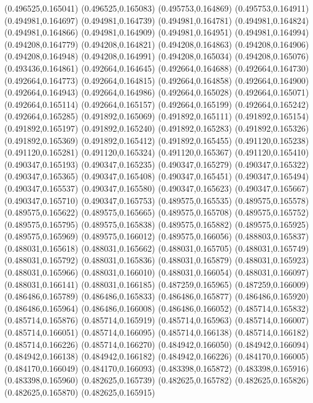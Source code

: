 (0.496525,0.165041)
(0.496525,0.165083)
(0.495753,0.164869)
(0.495753,0.164911)
(0.494981,0.164697)
(0.494981,0.164739)
(0.494981,0.164781)
(0.494981,0.164824)
(0.494981,0.164866)
(0.494981,0.164909)
(0.494981,0.164951)
(0.494981,0.164994)
(0.494208,0.164779)
(0.494208,0.164821)
(0.494208,0.164863)
(0.494208,0.164906)
(0.494208,0.164948)
(0.494208,0.164991)
(0.494208,0.165034)
(0.494208,0.165076)
(0.493436,0.164861)
(0.492664,0.164645)
(0.492664,0.164688)
(0.492664,0.164730)
(0.492664,0.164773)
(0.492664,0.164815)
(0.492664,0.164858)
(0.492664,0.164900)
(0.492664,0.164943)
(0.492664,0.164986)
(0.492664,0.165028)
(0.492664,0.165071)
(0.492664,0.165114)
(0.492664,0.165157)
(0.492664,0.165199)
(0.492664,0.165242)
(0.492664,0.165285)
(0.491892,0.165069)
(0.491892,0.165111)
(0.491892,0.165154)
(0.491892,0.165197)
(0.491892,0.165240)
(0.491892,0.165283)
(0.491892,0.165326)
(0.491892,0.165369)
(0.491892,0.165412)
(0.491892,0.165455)
(0.491120,0.165238)
(0.491120,0.165281)
(0.491120,0.165324)
(0.491120,0.165367)
(0.491120,0.165410)
(0.490347,0.165193)
(0.490347,0.165235)
(0.490347,0.165279)
(0.490347,0.165322)
(0.490347,0.165365)
(0.490347,0.165408)
(0.490347,0.165451)
(0.490347,0.165494)
(0.490347,0.165537)
(0.490347,0.165580)
(0.490347,0.165623)
(0.490347,0.165667)
(0.490347,0.165710)
(0.490347,0.165753)
(0.489575,0.165535)
(0.489575,0.165578)
(0.489575,0.165622)
(0.489575,0.165665)
(0.489575,0.165708)
(0.489575,0.165752)
(0.489575,0.165795)
(0.489575,0.165838)
(0.489575,0.165882)
(0.489575,0.165925)
(0.489575,0.165969)
(0.489575,0.166012)
(0.489575,0.166056)
(0.488803,0.165837)
(0.488031,0.165618)
(0.488031,0.165662)
(0.488031,0.165705)
(0.488031,0.165749)
(0.488031,0.165792)
(0.488031,0.165836)
(0.488031,0.165879)
(0.488031,0.165923)
(0.488031,0.165966)
(0.488031,0.166010)
(0.488031,0.166054)
(0.488031,0.166097)
(0.488031,0.166141)
(0.488031,0.166185)
(0.487259,0.165965)
(0.487259,0.166009)
(0.486486,0.165789)
(0.486486,0.165833)
(0.486486,0.165877)
(0.486486,0.165920)
(0.486486,0.165964)
(0.486486,0.166008)
(0.486486,0.166052)
(0.485714,0.165832)
(0.485714,0.165876)
(0.485714,0.165919)
(0.485714,0.165963)
(0.485714,0.166007)
(0.485714,0.166051)
(0.485714,0.166095)
(0.485714,0.166138)
(0.485714,0.166182)
(0.485714,0.166226)
(0.485714,0.166270)
(0.484942,0.166050)
(0.484942,0.166094)
(0.484942,0.166138)
(0.484942,0.166182)
(0.484942,0.166226)
(0.484170,0.166005)
(0.484170,0.166049)
(0.484170,0.166093)
(0.483398,0.165872)
(0.483398,0.165916)
(0.483398,0.165960)
(0.482625,0.165739)
(0.482625,0.165782)
(0.482625,0.165826)
(0.482625,0.165870)
(0.482625,0.165915)
